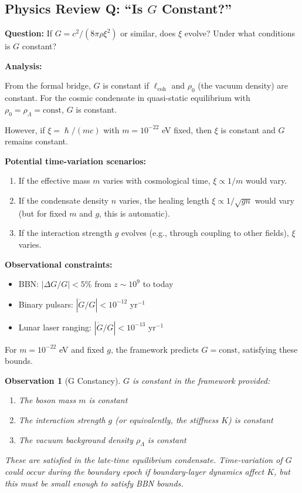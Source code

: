\documentclass[11pt,a4paper]{article}
\newcommand{\hbar}{\ensuremath{\hslash}}
\newtheorem{observation}{Observation}
\begin{document}
\subsection{Physics Review Q: ``Is $G$ Constant?''}

\textbf{Question:} If $G = c^2/(8\pi\rho\xi^2)$ or similar, does $\xi$ evolve? Under what conditions is $G$ constant?

\textbf{Analysis:}

From the formal bridge, $G$ is constant if $\ell_{\mathrm{coh}}$ and $\rho_0$ (the vacuum density) are constant. For the cosmic condensate in quasi-static equilibrium with $\rho_0 = \rho_\Lambda = \text{const}$, $G$ is constant.

However, if $\xi = \hbar/(mc)$ with $m = 10^{-22}$ eV fixed, then $\xi$ is constant and $G$ remains constant.

\textbf{Potential time-variation scenarios:}
\begin{enumerate}
    \item If the effective mass $m$ varies with cosmological time, $\xi \propto 1/m$ would vary.
    \item If the condensate density $n$ varies, the healing length $\xi \propto 1/\sqrt{gn}$ would vary (but for fixed $m$ and $g$, this is automatic).
    \item If the interaction strength $g$ evolves (e.g., through coupling to other fields), $\xi$ varies.
\end{enumerate}

\textbf{Observational constraints:}
\begin{itemize}
    \item BBN: $|\Delta G/G| < 5\%$ from $z \sim 10^9$ to today
    \item Binary pulsars: $|\dot{G}/G| < 10^{-12}$ yr$^{-1}$
    \item Lunar laser ranging: $|\dot{G}/G| < 10^{-13}$ yr$^{-1}$
\end{itemize}

For $m = 10^{-22}$ eV and fixed $g$, the framework predicts $G = \text{const}$, satisfying these bounds.

\begin{observation}[G Constancy]
$G$ is constant in the framework provided:
\begin{enumerate}
    \item The boson mass $m$ is constant
    \item The interaction strength $g$ (or equivalently, the stiffness $K$) is constant
    \item The vacuum background density $\rho_\Lambda$ is constant
\end{enumerate}
These are satisfied in the late-time equilibrium condensate. Time-variation of $G$ could occur during the boundary epoch if boundary-layer dynamics affect $K$, but this must be small enough to satisfy BBN bounds.
\end{observation}
\end{document}
